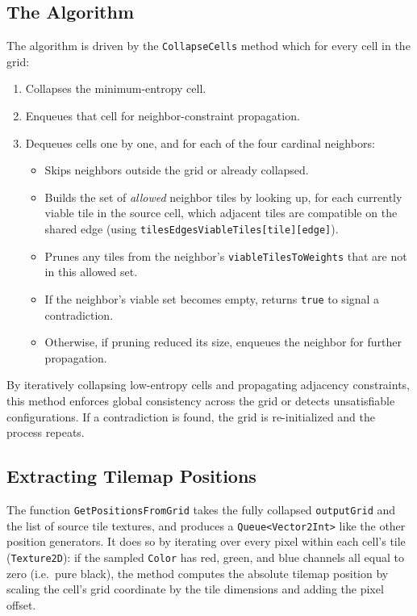 \documentclass[a4paper, 12pt, one column, aas_macros]{article}
\begin{document}
\subsection{The Algorithm}
The algorithm is driven by the \texttt{CollapseCells} method which for every cell in the grid:
\begin{enumerate}
  \item Collapses the minimum-entropy cell.
  \item Enqueues that cell for neighbor-constraint propagation.
  \item Dequeues cells one by one, and for each of the four cardinal neighbors:
    \begin{itemize}
      \item Skips neighbors outside the grid or already collapsed.
      \item Builds the set of \emph{allowed} neighbor tiles by looking up, for each currently viable tile in the source cell, which adjacent tiles are compatible on the shared edge (using \texttt{tilesEdgesViableTiles[tile][edge]}).
      \item Prunes any tiles from the neighbor's \texttt{viableTilesToWeights} that are not in this allowed set.
      \item If the neighbor's viable set becomes empty, returns \texttt{true} to signal a contradiction.
      \item Otherwise, if pruning reduced its size, enqueues the neighbor for further propagation.
    \end{itemize}
\end{enumerate}

By iteratively collapsing low-entropy cells and propagating adjacency constraints, this method enforces global consistency across the grid or detects unsatisfiable configurations. If a contradiction is found, the grid is re-initialized and the process repeats.

\subsection{Extracting Tilemap Positions}
The function \texttt{GetPositionsFromGrid} takes the fully collapsed \texttt{outputGrid} and the list of source tile textures, and produces a \texttt{Queue<Vector2Int>} like the other position generators. It does so by iterating over every pixel within each cell's tile (\texttt{Texture2D}): if the sampled \texttt{Color} has red, green, and blue channels all equal to zero (i.e.\ pure black), the method computes the absolute tilemap position by scaling the cell's grid coordinate by the tile dimensions and adding the pixel offset.
\end{document}

